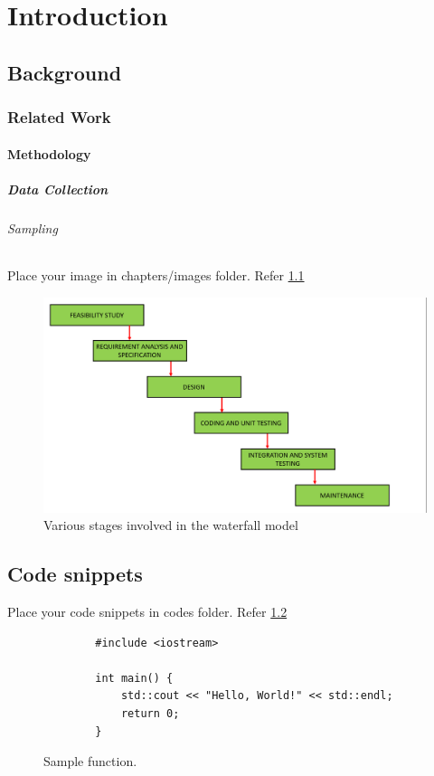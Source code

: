 \chapter{Introduction}
\section{Background}
\subsection{Related Work}
\subsubsection{Methodology}
\paragraph{Data Collection}
\subparagraph{Sampling}
Place your image in chapters/images folder. Refer \ref{fig:waterfall}
\begin{figure}
	\centering
	\includegraphics[scale=0.15]{chapters/images/waterfall.png}
	\caption{Various stages involved in the waterfall model}
	\label{fig:waterfall}
\end{figure}

\section{Code snippets}
Place your code snippets in codes folder. Refer \ref{fig:sample_code} 
\begin{figure}

	\begin{lstlisting}
		#include <iostream>
		
		int main() {
			std::cout << "Hello, World!" << std::endl;
			return 0;
		}
	\end{lstlisting}

	\caption{Sample function.}
	\label{fig:sample_code}
\end{figure}



